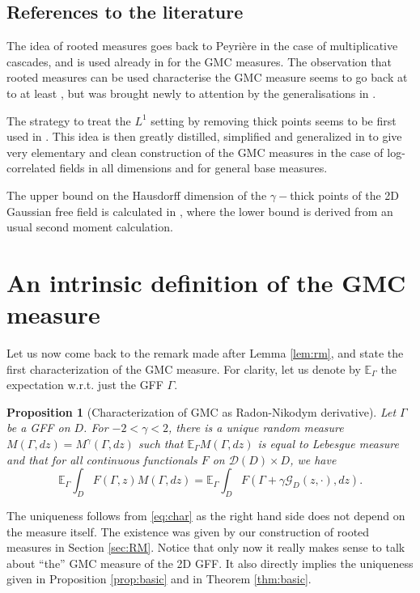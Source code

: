 \documentclass[11pt]{amsart}
\newtheorem{prop}[thm]{Proposition}
\newcommand{\G}{\mathcal G}
\newcommand{\E}{\mathbb E}
\renewcommand{\1}{\mathbf 1}
\begin{document}
\subsection*{References to the literature}

The idea of rooted measures goes back to Peyri\`ere \cite{Per} in the case of multiplicative cascades, and is used already in \cite{Kah} for the GMC measures. The observation that rooted measures can be used characterise the GMC measure seems to go back at to at least \cite{Sato}, but was brought newly to attention by the generalisations in \cite{Sha}.

The strategy to treat the $L^1$ setting by removing thick points seems to be first used in \cite{DS}. This idea is then greatly distilled, simplified and generalized in \cite{Ber} to give very elementary and clean construction of the GMC measures in the case of log-correlated fields in all dimensions and for general base measures. 

The upper bound on the Hausdorff dimension of the $\gamma-$thick points of the 2D Gaussian free field is calculated in \cite{TP}, where the lower bound is derived from an usual second moment calculation.

\section{An intrinsic definition of the GMC measure}\label{sec:intr}
Let us now come back to the remark made after Lemma \ref{lem:rm}, and state the first characterization of the GMC measure. For clarity, let us denote by $\E_\Gamma$ the expectation w.r.t. just the GFF $\Gamma$.

\begin{prop}[Characterization of GMC as Radon-Nikodym derivative]\label{prop:chr1}
Let $\Gamma$ be a GFF on $D$. For $-2 < \gamma < 2$, there is a unique random measure $M(\Gamma,dz)=M^\gamma(\Gamma,dz)$ such that $\E_\Gamma M(\Gamma,dz )$ is equal to Lebesgue measure and that for all continuous functionals $F$ on $\mathcal{D}(D)\times D$, we have
\begin{equation}\label{eq:char}
\E_\Gamma \int_D F(\Gamma, z) M(\Gamma, dz) = \E_\Gamma \int_D F(\Gamma + \gamma \G_D(z,\cdot),dz).
\end{equation}
\end{prop}

The uniqueness follows from \eqref{eq:char} as the right hand side does not depend on the measure itself. The existence was given by our construction of rooted measures in Section \ref{sec:RM}. Notice that only now it really makes sense to talk about ``the'' GMC measure of the 2D GFF. It also directly implies the uniqueness given in Proposition \ref{prop:basic} and in Theorem \ref{thm:basic}. 
\end{document}

